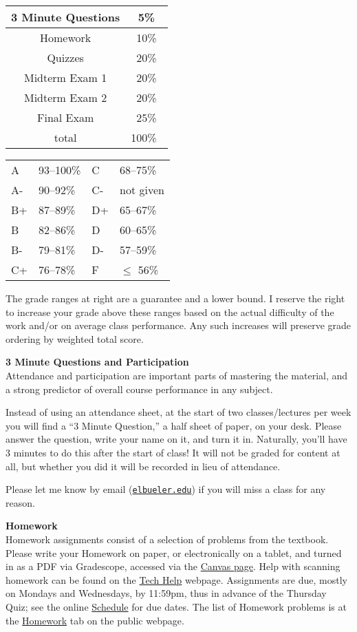 \documentclass[12pt]{article}
\renewcommand{\emph}[1]{\textsf{\textbf{#1}}}
\newcommand{\localhead}[1]{\par\smallskip\textbf{#1} \smallskip\nobreak\\}%
\def\heading#1{\localhead{\large\emph{#1}}}
\begin{document}
\begin{multicols}{2}
\begin{tabular}{|c|c|}
\hline
3 Minute Questions & 5\%\\
\hline
Homework & 10\% \\
\hline
Quizzes & 20\% \\
\hline
Midterm Exam 1 & 20\% \\
\hline
Midterm Exam 2 & 20\%  \\
\hline
Final Exam & 25\% \\
\hline
total & 100\% \, \\
\hline
\end{tabular}


\begin{tabular}{llll}
A  & 93--100\%& C  & 68--75\%  \\
A- & 90--92\% & C- & not given \\
B+ & 87--89\% & D+ & 65--67\%  \\
B  & 82--86\% & D  & 60--65\%  \\
B- & 79--81\% & D- & 57--59\%  \\
C+ & 76--78\% & F  & $\le$ 56\%
\end{tabular}
\end{multicols}

The grade ranges at right are a guarantee and a lower bound. I reserve the right to increase your grade above these ranges based on the actual difficulty of the work and/or on average class performance. Any such increases will preserve grade ordering by weighted total score. 


\heading{3 Minute Questions and Participation}
Attendance and participation are important parts of mastering the material, and a strong predictor of overall course performance in any subject.

Instead of using an attendance sheet, at the start of two classes/lectures per week you will find a ``3 Minute Question,'' a half sheet of paper, on your desk.  Please answer the question, write your name on it, and turn it in.  Naturally, you'll have 3 minutes to do this after the start of class!  It will not be graded for content at all, but whether you did it will be recorded in lieu of attendance.

Please let me know by email (\href{mailto:elbueler@alaska.edu}{\texttt{elbueler\@@alaska.edu}}) if you will miss a class for any reason.


\heading{Homework}
Homework assignments consist of a selection of problems from the textbook.  Please write your Homework on paper, or electronically on a tablet, and turned in as a PDF via Gradescope, accessed via the \href{https://canvas.alaska.edu/courses/9933}{Canvas page}.  Help with scanning homework can be found on the \href{https://uaf-math251.github.io/techHelp.html}{Tech Help} webpage.  Assignments are due, mostly on Mondays and Wednesdays, by 11:59pm, thus in advance of the Thursday Quiz; see the online \href{https://bueler.github.io/calc2/schedule.pdf}{Schedule} for due dates.  The list of Homework problems is at the \href{https://bueler.github.io/calc2/homework.html}{Homework} tab on the public webpage.
\end{document}

